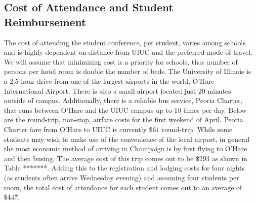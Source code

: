 

\subsection{Cost of Attendance and Student Reimbursement}
The cost of attending the student conference, per student, varies among schools and is highly dependent on distance from UIUC and the preferred mode of travel. We will assume that minimizing cost is a priority for schools, thus number of persons per hotel room is double the number of beds. The University of Illinois is a 2.5 hour drive from one of the largest airports in the world, O'Hare International Airport. There is also a small airport located just 20 minutes outside of campus. Additionally, there is a reliable bus service, Peoria Charter, that runs between O'Hare and the UIUC campus up to 10 times per day. Below are the round-trip, non-stop, airfare costs for the first weekend of April. Peoria Charter fare from O'Hare to UIUC is currently $\$61$ round-trip. While some students may wish to make use of the convenience of the local airport, in general the most economic method of arriving in Champaign is by first flying to O’Hare and then busing. The average cost of this trip comes out to be \$293 as shown in Table *******. Adding this to the registration and lodging costs for four nights (as students often arrive Wednesday evening) and assuming four students per room, the total cost of attendance for each student comes out to an average of \$447.

